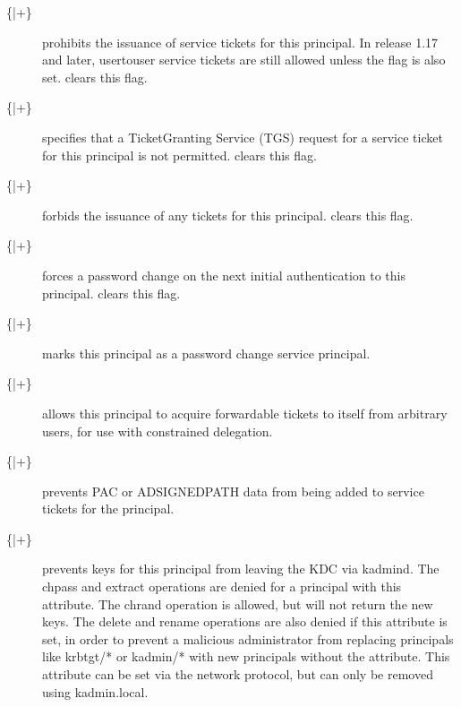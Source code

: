 \documentclass[letterpaper,10pt,english]{sphinxmanual}
\begin{document}
\begin{description}
\item[{\{\sphinxhyphen{}|+\}}] \leavevmode
\sphinxAtStartPar
{} prohibits the issuance of service tickets for this
principal.  In release 1.17 and later, user\sphinxhyphen{}to\sphinxhyphen{}user service
tickets are still allowed unless the  flag is
also set.   clears this flag.

\item[{\{\sphinxhyphen{}|+\}}] \leavevmode
\sphinxAtStartPar
{} specifies that a Ticket\sphinxhyphen{}Granting Service (TGS)
request for a service ticket for this principal is not permitted.
 clears this flag.

\item[{\{\sphinxhyphen{}|+\}}] \leavevmode
\sphinxAtStartPar
{} forbids the issuance of any tickets for this
principal.   clears this flag.

\item[{\{\sphinxhyphen{}|+\}}] \leavevmode
\sphinxAtStartPar
{} forces a password change on the next initial
authentication to this principal.   clears this
flag.

\item[{\{\sphinxhyphen{}|+\}}] \leavevmode
\sphinxAtStartPar
{} marks this principal as a password
change service principal.

\item[{\{\sphinxhyphen{}|+\}}] \leavevmode
\sphinxAtStartPar
{} allows this principal to acquire
forwardable tickets to itself from arbitrary users, for use with
constrained delegation.

\item[{\{\sphinxhyphen{}|+\}}] \leavevmode
\sphinxAtStartPar
{} prevents PAC or AD\sphinxhyphen{}SIGNEDPATH data from
being added to service tickets for the principal.

\item[{\{\sphinxhyphen{}|+\}}] \leavevmode
\sphinxAtStartPar
{} prevents keys for this principal from leaving
the KDC via kadmind.  The chpass and extract operations are denied
for a principal with this attribute.  The chrand operation is
allowed, but will not return the new keys.  The delete and rename
operations are also denied if this attribute is set, in order to
prevent a malicious administrator from replacing principals like
krbtgt/* or kadmin/* with new principals without the attribute.
This attribute can be set via the network protocol, but can only
be removed using kadmin.local.


\end{description}
\end{document}
